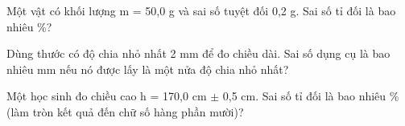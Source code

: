 \begin{ex} Một vật có khối lượng m = 50,0 g và sai số tuyệt đối 0,2 g. Sai số tỉ đối là bao
nhiêu \%?

\par{}
\end{ex}

\begin{ex} Dùng thước có độ chia nhỏ nhất 2 mm để đo chiều dài. Sai số dụng cụ là bao
nhiêu mm nếu nó được lấy là một nửa độ chia nhỏ nhất?

\par{}
\end{ex}

\begin{ex} Một học sinh đo chiều cao h = 170,0 cm $\pm$ 0,5 cm. Sai số tỉ đối là bao nhiêu \%
(làm tròn kết quả đến chữ số hàng phần mười)?

\par{}
\end{ex}
